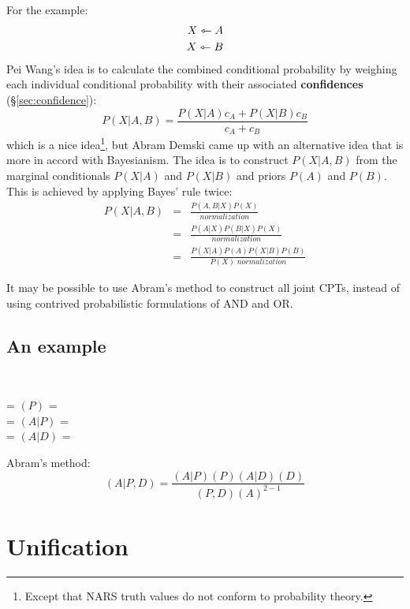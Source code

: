 For the example:
\begin{eqnarray}
X \leftarrowtriangle A \nonumber \\
X \leftarrowtriangle B \nonumber
\end{eqnarray}
Pei Wang's idea is to calculate the combined conditional probability by weighing each individual conditional probability with their associated \textbf{confidences} (\S\ref{sec:confidence}):
$$ P(X|A,B) = \frac{ P(X|A)c_A + P(X|B)c_B }{ c_A + c_B } $$
which is a nice idea\footnote{Except that NARS truth values do not conform to probability theory.}, but Abram Demski came up with an alternative idea that is more in accord with Bayesianism.  The idea is to construct $P(X|A,B)$ from the marginal conditionals $P(X|A)$ and $P(X|B)$ and priors $P(A)$ and $P(B)$.  This is achieved by applying Bayes' rule twice:
\begin{eqnarray}
P(X|A,B) &=& \frac{P(A,B|X)P(X)}{normalization} \nonumber \\
         &=& \frac{P(A|X)P(B|X)P(X)}{normalization} \nonumber \\
         &=& \frac{P(X|A)P(A)P(X|B)P(B)}{P(X) \; normalization}
\end{eqnarray}

It may be possible to use Abram's method to construct all joint CPTs, instead of using contrived probabilistic formulations of AND and OR.

\subsection{An example}

\\

 = $(P)$ =  \\
 = $(A \vert P)$ =  \\
 = $(A \vert D)$ = 

Abram's method:
$$ (A|P,D) = \frac { (A \vert P) (P) (A \vert D) (D) } { (P, D) (A)^{2-1} } $$

\section{Unification}
\label{sec:unification}

